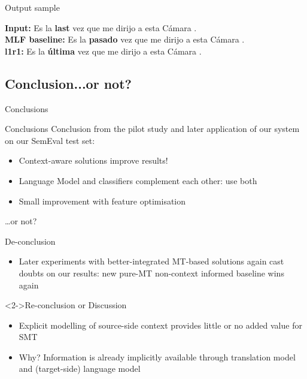 \documentclass[compress]{beamer}
\begin{document}
\begin{frame}{Output sample}
    \begin{example}
        {\footnotesize
        \textbf{Input:} Es la \textbf{last} vez que me dirijo a esta C\'amara . \\
        \textbf{MLF baseline:} Es la \textbf{pasado} vez que me dirijo a esta C\'amara .\\
        \textbf{l1r1:} Es la \textbf{\'ultima} vez que me dirijo a esta C\'amara .\\
        }
    \end{example}
\end{frame}

\subsection{Conclusion...or not?}

\begin{frame}{Conclusions}
    \begin{block}{Conclusions}
        Conclusion from the pilot study and later application of our system on our
        SemEval test set:
        \begin{itemize}
            \item Context-aware solutions improve results!
            \item Language Model and classifiers complement each other: use both
            \item Small improvement with feature optimisation
        \end{itemize}
    \end{block}
\end{frame}


\begin{frame}{\ldots or not?}
    \begin{block}{De-conclusion}
        \begin{itemize}
            \item Later experiments with better-integrated MT-based solutions 
              again cast doubts on our results: new pure-MT non-context informed baseline wins again
        \end{itemize}
    \end{block}

    \begin{block}<2->{Re-conclusion or Discussion}
        \begin{itemize}
            \item Explicit modelling of source-side context provides little
              or no added value for SMT
            \item Why? Information is already implicitly available through
              translation model and (target-side) language model
        \end{itemize}
    \end{block}
\end{frame}
\end{document}

